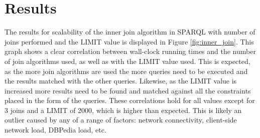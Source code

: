 \documentclass[10pt,a4paper]{article}
\begin{document}
	
	\section*{Results}
	
	The results for scalability of the inner join algorithm in SPARQL with number of joins performed and the LIMIT value is displayed in Figure \ref{fig:inner_join}. This graph shows a clear correlation between wall-clock running times and the number of join algorithms used, as well as with the LIMIT value used. This is expected, as the more join algorithms are used the more queries need to be executed and the results matched with the other queries. Likewise, as the LIMIT value is increased more results need to be found and matched against all the constraints placed in the form of the queries. These correlations hold for all values except for 3 joins and a LIMIT of 2000, which is higher than expected. This is likely an outlier caused by any of a range of factors: network connectivity, client-side network load, DBPedia load, etc.
	
\end{document}
